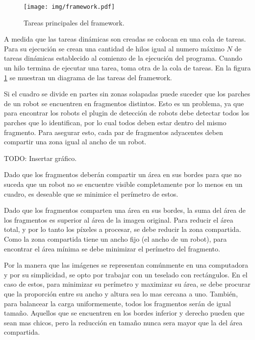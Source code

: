 \begin{figure}[!h]

	\texttt{[image: img/framework.pdf]}

	\caption{Tareas principales del framework.}

	\label{tareasFramework}

\end{figure}

A medida que las tareas dinámicas son creadas se colocan en una cola de tareas.
Para su ejecución se crean una cantidad de hilos igual al numero máximo $N$ de
tareas dinámicas establecido al comienzo de la ejecución del programa. Cuando un
hilo termina de ejecutar una tarea, toma otra de la cola de tareas. En la figura
\ref{tareasFramework} se muestran un diagrama de las tareas del framework.

Si el cuadro se divide en partes sin zonas solapadas puede suceder que los
parches de un robot se encuentren en fragmentos distintos. Esto es un problema,
ya que para encontrar los robots el plugin de detección de robots debe detectar
todos los parches que lo identifican, por lo cual todos deben estar dentro del
mismo fragmento. Para asegurar esto, cada par de fragmentos adyacentes deben
compartir una zona igual al ancho de un robot.

TODO: Insertar gráfico.

Dado que los fragmentos deberán compartir un área en sus bordes para que no
suceda que un robot no se encuentre visible completamente por lo menos en un
cuadro, es deseable que se minimice el perímetro de estos.

Dado que los fragmentos comparten una área en sus bordes, la suma del área de
los fragmentos es superior al área de la imagen original. Para reducir el área
total, y por lo tanto los píxeles a procesar, se debe reducir la zona
compartida. Como la zona compartida tiene un ancho fijo (el ancho de un robot),
para encontrar el área mínima se debe minimizar el perímetro del fragmento.

Por la manera que las imágenes se representan comúnmente en una computadora y
por su simplicidad, se opto por trabajar con un teselado con rectángulos. En el
caso de estos, para minimizar su perímetro y maximizar su área, se debe procurar
que la proporción entre su ancho y altura sea lo mas cercana a uno. También,
para balancear la carga uniformemente, todos los fragmentos serán de igual
tamaño. Aquellos que se encuentren en los bordes inferior y derecho pueden que
sean mas chicos, pero la reducción en tamaño nunca sera mayor que la del área
compartida.

